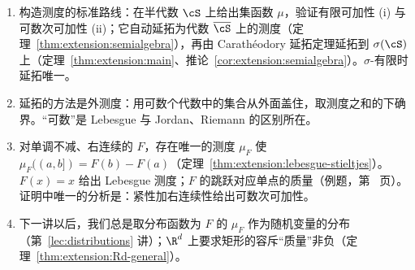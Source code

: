 \begin{enumerate}
\item 构造测度的标准路线：在半代数 $\cS$ 上给出集函数 $\mu$，验证有限可加性 (i) 与可数次可加性 (ii)；它自动延拓为代数 $\overline\cS$ 上的测度（定理~\ref{thm:extension:semialgebra}），再由 Carathéodory 延拓定理延拓到 $\sigma(\cS)$ 上（定理~\ref{thm:extension:main}、推论~\ref{cor:extension:semialgebra}）。$\sigma$-有限时延拓唯一。
\item 延拓的方法是外测度：用可数个代数中的集合从外面盖住，取测度之和的下确界。“可数”是 Lebesgue 与 Jordan、Riemann 的区别所在。
\item 对单调不减、右连续的 $F$，存在唯一的测度 $\mu_F$ 使 $\mu_F((a,b])=F(b)-F(a)$（定理~\ref{thm:extension:lebesgue-stieltjes}）。$F(x)=x$ 给出 Lebesgue 测度；$F$ 的跳跃对应单点的质量（例题，第~\pageref{we:extension:atoms} 页）。证明中唯一的分析是：紧性加右连续性给出可数次可加性。
\item 下一讲以后，我们总是取分布函数为 $F$ 的 $\mu_F$ 作为随机变量的分布（第~\ref{lec:distributions} 讲）；$\R^d$ 上要求矩形的容斥“质量”非负（定理~\ref{thm:extension:Rd-general}）。
\end{enumerate}

\label{hw:extension}


